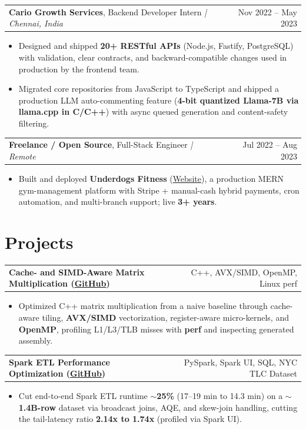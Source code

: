 \documentclass[letterpaper,11pt]{article}
\makeatletter
\newcommand{\expItem}[4]{%
  \vspace{3pt}
  \begin{tabular*}{\textwidth}{@{}l@{\extracolsep{\fill}}r@{}}
    \textbf{#1}, #2 \textit{| #3} & #4 \\
  \end{tabular*}\par\vspace{-2pt}
}
\newcommand{\projItem}[2]{%
  \vspace{6pt}
  \begin{tabular*}{\textwidth}{@{}l@{\extracolsep{\fill}}r@{}}
    \textbf{#1} & #2 \\
  \end{tabular*}\par\vspace{-2pt}
}
\makeatother
\begin{document}
\expItem{Cario Growth Services}{Backend Developer Intern}{Chennai, India}{Nov 2022 -- May 2023}
\begin{itemize}
  \item Designed and shipped \textbf{20+ RESTful APIs} (Node.js, Fastify, PostgreSQL) with validation, clear contracts, and backward-compatible changes used in production by the frontend team.
  \item Migrated core repositories from JavaScript to TypeScript and shipped a production LLM auto-commenting feature (\textbf{4-bit quantized Llama-7B via llama.cpp in C/C++}) with async queued generation and content-safety filtering.
\end{itemize}

\expItem{Freelance / Open Source}{Full-Stack Engineer}{Remote}{Jul 2022 -- Aug 2023}
\begin{itemize}
  \item Built and deployed \textbf{Underdogs Fitness} (\href{https://www.underdogsfitness.in/}{Website}), a production MERN gym-management platform with Stripe + manual-cash hybrid payments, cron automation, and multi-branch support; live \textbf{3+ years}.
\end{itemize}

\section{Projects}

\projItem{Cache- and SIMD-Aware Matrix Multiplication {\normalfont\small(\href{https://github.com/Deva-1903/cs690pf}{GitHub})}}{C++, AVX/SIMD, OpenMP, Linux perf}
\begin{itemize}
  \item Optimized C++ matrix multiplication from a naive baseline through cache-aware tiling, \textbf{AVX/SIMD} vectorization, register-aware micro-kernels, and \textbf{OpenMP}, profiling L1/L3/TLB misses with \textbf{perf} and inspecting generated assembly.
\end{itemize}

\projItem{Spark ETL Performance Optimization {\normalfont\small(\href{https://github.com/Deva-1903/Spark-ETL-Optimization}{GitHub})}}{PySpark, Spark UI, SQL, NYC TLC Dataset}
\begin{itemize}
  \item Cut end-to-end Spark ETL runtime \textbf{$\sim$25\%} (17--19 min to 14.3 min) on a \textbf{$\sim$1.4B-row} dataset via broadcast joins, AQE, and skew-join handling, cutting the tail-latency ratio \textbf{2.14x to 1.74x} (profiled via Spark UI).
\end{itemize}
\end{document}
